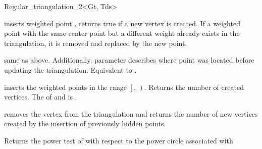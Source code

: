 \begin{ccClassTemplate}{Regular_triangulation_2<Gt, Tds>}

{inserts  weighted point .
returns true if a new vertex is created. 
If a weighted point with the same center point but a 
different weight already exists in the triangulation, 
it is removed and replaced by the new point.
}

{same as above. Additionally, parameter  describes where point
  was located before updating the triangulation.}
{Equivalent to .}

{inserts the weighted points in the range
 $\left[\right.$, $\left.\right)$.
 Returns the number of created vertices.
 \ccPrecond The  of  and 
 is .}

{removes the vertex from the triangulation and
returns the number of new vertices created by the insertion of previously
hidden points.}








\ccThreeToTwo

{Returns the power test of   with respect to the 
power circle  associated with }


\end{ccClassTemplate}
